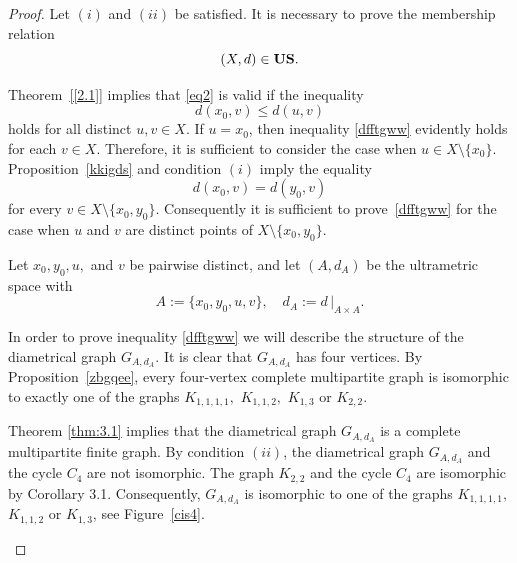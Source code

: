\documentclass[11pt]{article}
\theoremstyle{definition}
\theoremstyle{remark}
\numberwithin{equation}{section}
\begin{document}
\begin{proof}
 Let $(i)$ and $(ii)$ be satisfied.  
It is necessary to prove the membership relation
\begin{equation}\label{eq2}
(X,d) \in {\bf US}.
\end{equation}


 Theorem~\ref{[2.1]} implies that \eqref{eq2} is valid if the inequality 
\begin{equation}\label{dfftgww}
    d(x_0,v)\leq d(u,v)
\end{equation}
holds for all distinct $u,v\in X$. 
If $u = x_0$, then inequality \eqref{dfftgww} evidently holds for each $v \in X$.
Therefore, it is sufficient to consider the case when $u \in X \setminus \{x_0\}$.
Proposition~\ref{kkigds} and condition $(i)$ imply the equality
\[
d(x_0,v) = d(y_0,v)
\]
 for every $v \in X \setminus \{x_0,y_0\}$.
Consequently it is sufficient to prove~\eqref{dfftgww} for the case when $u$ and $v$
are distinct points of $X \setminus \{x_0,y_0\}$.

Let $x_0, y_0, u,$ and $v$ be pairwise distinct, and let $(A,d_A)$ be the ultrametric space with 
\[
A:=\{x_0,y_0,u,v\}, \quad d_A := d\,\big|_{A\times A}.
\]

In order to prove inequality \eqref{dfftgww} we will describe the structure of the diametrical graph $G_{A,d_A}$.
It is clear that  $G_{A,d_A}$ has four vertices.
By Proposition~\ref{zbgqee}, every four-vertex complete multipartite graph is isomorphic to exactly one of the graphs $K_{1,1,1,1},$ $K_{1,1,2},$ $K_{1,3}$ or $K_{2,2}.$
 


Theorem \ref{thm:3.1} implies that the diametrical graph $G_{A,d_A}$ is a complete multipartite finite graph.
By condition $(ii)$, the diametrical graph $G_{A,d_A}$ and the cycle $C_4$ are not isomorphic. The graph $K_{2,2}$ and the cycle $C_4$ are isomorphic by Corollary 3.1.  Consequently, $G_{A,d_A}$ is isomorphic to one of the graphs
 $K_{1,1,1,1},$ $K_{1,1,2}$ or $K_{1,3}$,
see Figure~\ref{cis4}.

\begin{figure}[H]
  \centering
\end{figure}
\end{proof}
\end{document}

